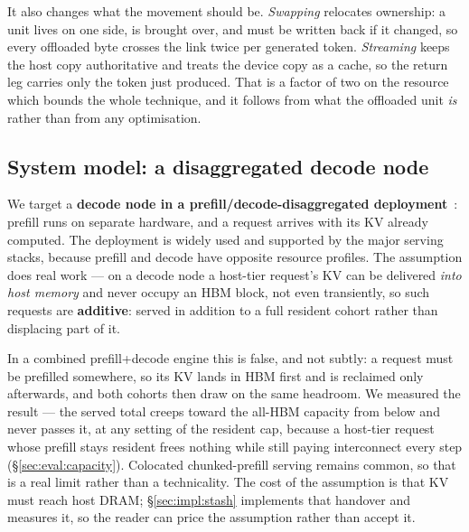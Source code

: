 It also changes what the movement should be. \emph{Swapping} relocates ownership:
a unit lives on one side, is brought over, and must be written back if it changed,
so every offloaded byte crosses the link twice per generated token.
\emph{Streaming} keeps the host copy authoritative and treats the device copy as a
cache, so the return leg carries only the token just produced. That is a factor of
two on the resource which bounds the whole technique, and it follows from what the
offloaded unit \emph{is} rather than from any optimisation.

\subsection{System model: a disaggregated decode node}
\label{sec:background:pd}

We target a \textbf{decode node in a prefill/decode-disaggregated
deployment}~\cite{distserve,splitwise,mooncake}: prefill runs on separate
hardware, and a request arrives with its KV already computed. The deployment is
widely used and supported by the major serving stacks, because prefill and decode
have opposite resource profiles. The assumption does real work --- on a decode
node a host-tier request's KV can be delivered \emph{into host memory} and never
occupy an HBM block, not even transiently, so such requests are \textbf{additive}:
served in addition to a full resident cohort rather than displacing part of it.

In a combined prefill+decode engine this is false, and not subtly: a request must
be prefilled somewhere, so its KV lands in HBM first and is reclaimed only
afterwards, and both cohorts then draw on the same headroom. We measured the
result --- the served total creeps toward the all-HBM capacity from below and
never passes it, at any setting of the resident cap, because a host-tier request
whose prefill stays resident frees nothing while still paying interconnect every
step (\S\ref{sec:eval:capacity}). Colocated chunked-prefill serving remains
common, so that is a real limit rather than a technicality. The cost of the
assumption is that KV must reach host DRAM; \S\ref{sec:impl:stash} implements that
handover and measures it, so the reader can price the assumption rather than
accept it.

